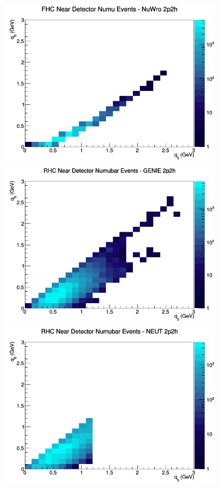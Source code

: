 \documentclass[12pt]{article}
\begin{document}
\begin{figure}[h]
\endminipage
{}
\includegraphics[width=\linewidth]{q0_q3/nominal/2p2h_FHC_ND_numu_q3_q0_NuWro.png}
\endminipage
\newline
{}
\includegraphics[width=\linewidth]{q0_q3/nominal/2p2h_RHC_ND_numubar_q3_q0_GENIE.png}
\endminipage
{}
\includegraphics[width=\linewidth]{q0_q3/nominal/2p2h_RHC_ND_numubar_q3_q0_NEUT.png}

\end{figure}
\end{document}
